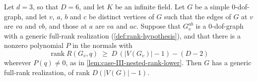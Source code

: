 \begin{lemma}[The case $d = 3$ of Case~III; KT Lemma~6.10]
  \label{lem:case-III-candidate-dispatch-d3}
  \leanok
  Let $d = 3$, so that $D = 6$, and let $K$ be an infinite field. Let $G$
  be a simple $0$-dof-graph, and let $v$, $a$, $b$ and $c$ be distinct
  vertices of $G$ such that the edges of $G$ at $v$ are $va$ and $vb$,
  and those at $a$ are $va$ and $ac$. Suppose that $G_v^{ab}$ is a
  $0$-dof-graph with a generic full-rank realization
  (\cref{def:rank-hypothesis}), and that there is a
  nonzero polynomial $P$ in the normals with
  \[
    \operatorname{rank} R(G_v, q) \;\ge\; D\,(|V(G_v)| - 1) - (D - 2)
  \]
  wherever $P(q) \neq 0$, as in \cref{lem:case-III-nested-rank-lower}.
  Then $G$ has a generic full-rank realization, of rank
  $D(|V(G)| - 1)$.
\end{lemma}
